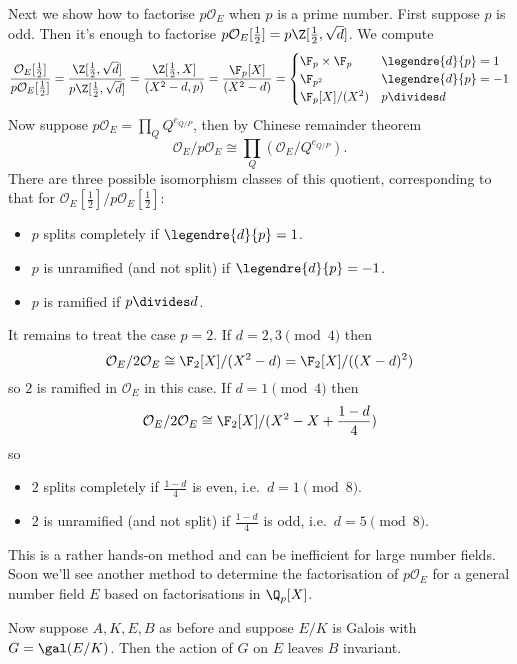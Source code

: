 \documentclass[a4paper]{article}
\renewcommand*{\O}{\mathcal{O}}
\begin{document}
\begin{eg}
  Next we show how to factorise \(p \O_E\) when \(p\) is a prime number. First suppose \(p\) is odd. Then it's enough to factorise \(p\O_E[\frac{1}{2}] = p\Z[\frac{1}{2}, \sqrt d]\). We compute
  \[
    \frac{\O_E[\frac{1}{2}]}{p \O_E[\frac{1}{2}]}
    = \frac{\Z[\frac{1}{2}, \sqrt d]}{p \Z[\frac{1}{2}, \sqrt d]}
    = \frac{\Z[\frac{1}{2}, X]}{(X^2 - d, p)}
    = \frac{\F_p[X]}{(X^2 - d)}
    =
    \begin{cases}
      \F_ p \times \F_p & \legendre{d}{p} = 1 \\
      \F_{p^2} & \legendre{d}{p} = -1 \\
      \F_p[X]/(X^2) & p \divides d
    \end{cases}
  \]
  Now suppose \(p \O_E = \prod_Q Q^{e_{Q/P}}\), then by Chinese remainder theorem
  \[
    \O_E/p\O_E \cong \prod_Q (\O_E/Q^{e_{Q/P}}).
  \]
  There are three possible isomorphism classes of this quotient, corresponding to that for \(\O_E[\frac{1}{2}]/p\O_E[\frac{1}{2}]\):
  \begin{itemize}
  \item \(p\) splits completely if \(\legendre{d}{p} = 1\).
  \item \(p\) is unramified (and not split) if \(\legendre{d}{p} = -1\).
  \item \(p\) is ramified if \(p \divides d\).
  \end{itemize}

  It remains to treat the case \(p = 2\). If \(d = 2, 3 \pmod 4\) then
  \[
    \O_E/2\O_E \cong \F_2[X]/(X^2 - d) = \F_2[X]/((X - d)^2)
  \]
  so \(2\) is ramified in \(\O_E\) in this case. If \(d = 1 \pmod 4\) then
  \[
    \O_E/2\O_E \cong \F_2[X]/(X^2 - X + \frac{1 - d}{4})
  \]
  so
  \begin{itemize}
  \item \(2\) splits completely if \(\frac{1 - d}{4}\) is even, i.e.\ \(d = 1 \pmod 8\).
  \item \(2\) is unramified (and not split) if \(\frac{1 - d}{4}\) is odd, i.e.\ \(d = 5 \pmod 8\).
  \end{itemize}

  This is a rather hands-on method and can be inefficient for large number fields. Soon we'll see another method to determine the factorisation of \(p \O_E\) for a general number field \(E\) based on factorisations in \(\Q_p[X]\).
\end{eg}

Now suppose \(A, K, E, B\) as before and suppose \(E/K\) is Galois with \(G = \gal(E/K)\). Then the action of \(G\) on \(E\) leaves \(B\) invariant.
\end{document}
